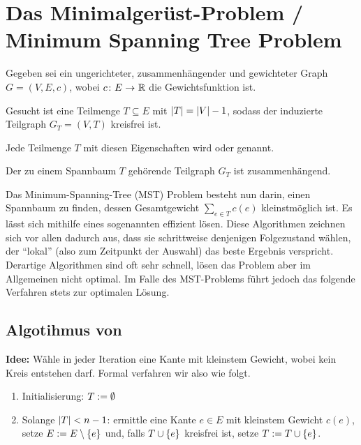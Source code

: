 \section{Das Minimalgerüst-Problem / Minimum Spanning Tree Problem}

Gegeben sei ein ungerichteter, zusammenhängender und gewichteter Graph $G = (V,E,c)$, wobei $\abb{c}{E}{\R}$ die Gewichtsfunktion ist.

Gesucht ist eine Teilmenge $T \subseteq E$ mit $\left| T \right| = \left| V \right| - 1$, sodass der induzierte Teilgraph $G_T = (V,T)$ kreisfrei ist.

\begin{definition}
	Jede Teilmenge $T$ mit diesen Eigenschaften wird  oder  genannt.
\end{definition}

\begin{bemerkung}
	Der zu einem Spannbaum $T$ gehörende Teilgraph $G_T$ ist zusammenhängend.
\end{bemerkung}

Das Minimum-Spanning-Tree (MST) Problem besteht nun darin, einen Spannbaum zu finden, dessen Gesamtgewicht $\sum_{e \in T} c(e)$ kleinstmöglich ist. Es lässt sich mithilfe eines sogenannten  effizient lösen. Diese Algorithmen zeichnen sich vor allen dadurch aus, dass sie schrittweise denjenigen Folgezustand wählen, der \enquote{lokal} (also zum Zeitpunkt der Auswahl) das beste Ergebnis verspricht. Derartige Algorithmen sind oft sehr schnell, lösen das Problem aber im Allgemeinen nicht optimal. Im Falle des MST-Problems führt jedoch das folgende Verfahren stets zur optimalen Lösung.

\subsection{Algotihmus von }

\textbf{Idee:} Wähle in jeder Iteration eine Kante mit kleinstem Gewicht, wobei kein Kreis entstehen darf. Formal verfahren wir also wie folgt.

\begin{enumerate}[label=Schritt \arabic*:, leftmargin=*, start=0]
	\item Initialisierung: $T \mathrel{:=} \emptyset$
	\item Solange $\left| T \right| < n -1$: ermittle eine Kante $e \in E$ mit kleinstem Gewicht $c(e)$, setze $E \mathrel{:=} E \setminus \left\{ e \right\}$ und, falls $T \cup \left\{ e \right\}$ kreisfrei ist, setze $T \mathrel{:=} T \cup \left\{ e \right\}$.
\end{enumerate}

